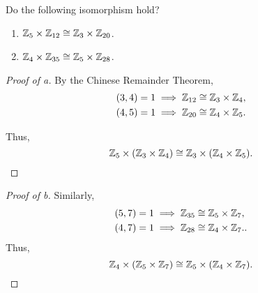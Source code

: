 \documentclass[../hw8]{subfiles}
\begin{document}
\begin{problem}
Do the following isomorphism hold?
\begin{enumerate}[label=\alph*)]
	\item $\mathbb{Z}_5\times \mathbb{Z}_{12}\cong\mathbb{Z}_3\times \mathbb{Z}_{20} $.
	\item  $\mathbb{Z}_4\times \mathbb{Z}_{35}\cong\mathbb{Z}_5\times \mathbb{Z}_{28} $.
\end{enumerate}
\end{problem}
\begin{proof}[Proof of a]
	By the Chinese Remainder Theorem,
	\begin{align*}
		(3,4)=1 & \implies \mathbb{Z}_{12} \cong \mathbb{Z}_3\times \mathbb{Z}_4, \\
		(4,5)=1 & \implies \mathbb{Z}_{20}\cong\mathbb{Z}_4\times \mathbb{Z}_5
		.\end{align*}

	Thus, \[
		\mathbb{Z}_5\times (\mathbb{Z}_3\times \mathbb{Z}_4)\cong\mathbb{Z}_3\times (\mathbb{Z}_4\times \mathbb{Z}_5)
		.\]
\end{proof}
\begin{proof}[Proof of b]
	Similarly,
	\begin{align*}
		(5,7)=1 & \implies \mathbb{Z}_{35}\cong\mathbb{Z}_5\times \mathbb{Z}_7, \\
		(4,7)=1 & \implies \mathbb{Z}_{28}\cong\mathbb{Z}_4\times \mathbb{Z}_7.
		.\end{align*}
	Thus, \[
		\mathbb{Z}_4\times (\mathbb{Z}_5\times \mathbb{Z}_7)\cong \mathbb{Z}_5\times (\mathbb{Z}_4\times \mathbb{Z}_7)
		.\]
\end{proof}
\end{document}
